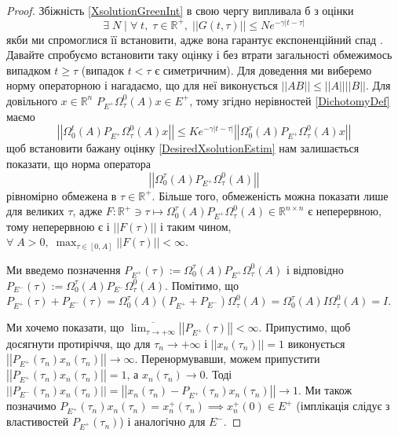 \documentclass[14pt]{extarticle} %
\let\oldlim\lim
\renewcommand{\lim}{\displaystyle\oldlim}
\let\oldmax\max
\renewcommand{\max}{\displaystyle\oldmax}
\let\oldforall\forall
\renewcommand{\forall}{\oldforall\;}
\let\oldexists\exists
\renewcommand{\exists}{\oldexists\;}
\newcommand{\mynorm}[1]{\left|\left|#1\right|\right|}
\newcommand{\myabs}[1]{\left|#1\right|}
\begin{document}
\begin{proof}
	Збіжність \ref{XsolutionGreenInt} в свою чергу випливала б з оцінки
	\[\label{DesiredXsolutionEstim}
	\tag{$\star$}\exists N\mid \forall t,\;\tau\in\mathbb{R}^+,\;\mynorm{G(t,\tau)}\leq Ne^{-\gamma\myabs{t-\tau}}\]
	якби ми спромоглися її встановити, адже вона гарантує експоненційний спад
	. Давайте спробуємо встановити таку оцінку і без втрати загальності обмежимось випадком $t\geq\tau$ (випадок
	$t<\tau$ є симетричним). Для доведення ми виберемо норму операторною 
	і нагадаємо, що для неї виконується $\mynorm{AB}\leq\mynorm{A}\mynorm{
	B}$.
	Для довільного $x\in\mathbb{R}^n$ $P_{E^+}\Omega^0_{\tau}(A)x\in E^+$, тому згідно нерівностей \ref{DichotomyDef}
	маємо
	\[\mynorm{\Omega_0^t(A) P_{E^+} \Omega^0_{\tau}(A)x}\leq Ke^{-\gamma\myabs{t-\tau}}\mynorm{\Omega_0^{\tau}(A) P_{E^+} \Omega^0_{\tau}(A)x}\]
	щоб встановити бажану оцінку \ref{DesiredXsolutionEstim} нам залишається показати, що норма оператора 
	\[\mynorm{\Omega_0^{\tau}(A) P_{E^+} \Omega^0_{\tau}(A)}\]
	рівномірно обмежена в $\tau\in\mathbb{R}^+$. Більше того, обмеженість можна показати лише для великих $\tau$, адже 
	$F:\mathbb{R^+}\ni \tau\mapsto\Omega_0^{\tau}(A) P_{E^+} \Omega^0_{\tau}(A)\in\mathbb{R}^{n\times n}
	$ є неперервною, тому неперервною є і $\mynorm{F(\tau)}$ і
	таким чином, $\forall A>0,\;\max_{\tau\in[0,A]}\mynorm{F(\tau)}<\infty$. 

	Ми введемо позначення $P_{E^+}(\tau):=	\Omega_0^{\tau}(A) P_{E^+} \Omega^0_{\tau}(A)$ і відповідно 
	$P_{E^-}(\tau):=\Omega_0^{\tau}(A) P_{E^-} \Omega^0_{\tau}(A)$. Помітимо, що $P_{E^+}(\tau)+P_{E^-}(\tau)=
	\Omega_0^{\tau}(A) (P_{E^+}+P_{E^-}) \Omega^0_{\tau}(A)=\Omega_0^{\tau}(A)I\Omega^0_{\tau}(A)=I$. 
	
	Ми хочемо показати,
	що $\overline{\lim_{\tau\to+\infty}}\mynorm{P_{E^+}(\tau)}<\infty$. Припустимо, щоб досягнути протиріччя, що для
	$\tau_n\to+\infty$ і $\mynorm{x_n(\tau_n)}=1$ виконується $\mynorm{P_{E^+}(\tau_n)x_n(\tau_n)}\to\infty$. Перенормувавши, можем припустити
	$\mynorm{P_{E^+}(\tau_n)x_n(\tau_n)}=1$, а $x_n(\tau_n)\to 0$. 
	Тоді $\mynorm{P_{E^-}(\tau_n)x_n(\tau_n)}=\mynorm{x_n(\tau_n)-P_{E^+}(\tau_n)x_n(\tau_n)}\to 1$. Ми також
	позначимо $P_{E^+}(\tau_n)x_n(\tau_n)=x^+_n(\tau_n)\implies x^+_n(0)\in E^+$ (імплікація слідує
	з властивостей $P_{E^+}(\tau_n)$) і аналогічно для $E^-$.


\end{proof}
\end{document}

